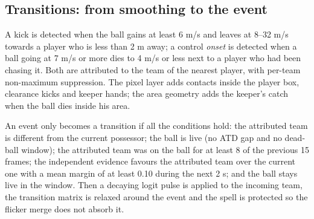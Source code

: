 \documentclass[10pt,a4paper]{article}
\begin{document}
\subsection{Transitions: from smoothing to the event}

A kick is detected when the ball gains at least 6 m/s and leaves at 8--32 m/s towards a
player who is less than 2 m away; a control \emph{onset} is detected when a ball going at 7
m/s or more dies to 4 m/s or less next to a player who had been chasing it. Both are
attributed to the team of the nearest player, with per-team non-maximum suppression. The
pixel layer adds contacts inside the player box, clearance kicks and keeper hands; the area
geometry adds the keeper's catch when the ball dies inside his area.

An event only becomes a transition if all the conditions hold: the attributed team is
different from the current possessor; the ball is live (no ATD gap and no dead-ball window);
the attributed team was on the ball for at least 8 of the previous 15 frames; the
independent evidence favours the attributed team over the current one with a mean margin of
at least 0.10 during the next 2 s; and the ball stays live in the window. Then a decaying
logit pulse is applied to the incoming team, the transition matrix is relaxed around the
event and the spell is protected so the flicker merge does not absorb it.
\end{document}
